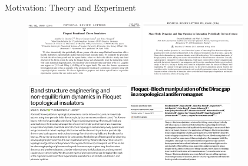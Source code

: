 \documentclass[xcolor=dvipsnames,10pt,aspectratio=169]{beamer}
\newcommand{\MO}{Motivation}
\begin{document}
  \begin{frame}{\MO: Theory and Experiment}

    \begin{figure}
      \includegraphics[width=0.45\textwidth]{./figures/grushin.png}
      \includegraphics[width=0.40\textwidth]{./figures/kandelaki.png}
    \end{figure}
      \vspace{1em}
    \begin{figure}
      \includegraphics[width=0.40\textwidth]{./figures/rudner.png}
      \includegraphics[width=0.40\textwidth]{./figures/bielinski.png}
    \end{figure}

  \end{frame}
\end{document}
